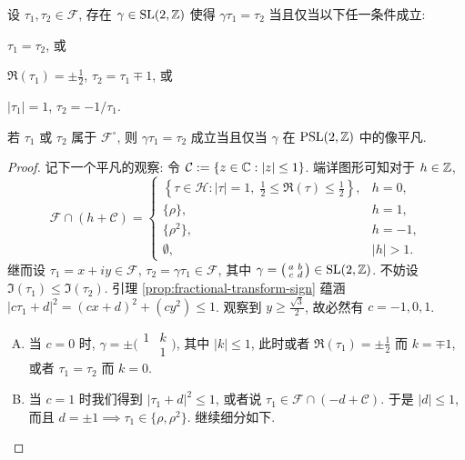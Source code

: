 \begin{lemma}\label{prop:full-fundamental-domain-aux}
	设 $\tau_1, \tau_2 \in \mathcal{F}$, 存在 $\gamma \in \operatorname{SL}(2,\mathbb{Z})$ 使得 $\gamma \tau_1 = \tau_2$ 当且仅当以下任一条件成立:
	\begin{compactitem}
		\item $\tau_1 = \tau_2$, 或
		\item $\Re(\tau_1) = \pm \frac{1}{2}$, $\tau_2 = \tau_1 \mp 1$, 或
		\item $|\tau_1|=1$, $\tau_2 = -1/\tau_1$.
	\end{compactitem}
	若 $\tau_1$ 或 $\tau_2$ 属于 $\mathcal{F}^\circ$, 则 $\gamma\tau_1 = \tau_2$ 成立当且仅当 $\gamma$ 在 $\operatorname{PSL}(2,\mathbb{Z})$ 中的像平凡.
\end{lemma}
\begin{proof}
	记下一个平凡的观察: 令 $\mathcal{C} := \{z \in \mathbb{C}: |z| \leq 1 \}$. 端详图形可知对于 $h \in \mathbb{Z}$,
	\[ \mathcal{F} \cap (h +  \mathcal{C} ) = \begin{cases}
		\left\{ \tau \in \mathcal{H}: |\tau| = 1, \; \frac{1}{2} \leq \Re(\tau) \leq \frac{1}{2} \right\}, & h=0, \\
		\{\rho\}, & h = 1, \\
		\{\rho^2 \}, & h = -1, \\
		\emptyset, & |h| > 1.
	\end{cases}\]
	继而设 $\tau_1 = x+iy \in \mathcal{F}$, $\tau_2 = \gamma\tau_1 \in \mathcal{F}$, 其中 $\gamma = \bigl(\begin{smallmatrix} a & b \\ c & d \end{smallmatrix}\bigr) \in \operatorname{SL}(2,\mathbb{Z})$. 不妨设 $\Im(\tau_1) \leq \Im(\tau_2)$. 引理 \ref{prop:fractional-transform-sign} 蕴涵 $|c\tau_1 + d|^2 = (cx+d)^2 + (cy^2) \leq 1$. 观察到 $y \geq \frac{\sqrt{3}}{2}$, 故必然有 $c = -1, 0, 1$.
	\begin{enumerate}[A.]
		\item 当 $c=0$ 时, $\gamma = \pm \bigl(\begin{smallmatrix} 1 & k \\ & 1 \end{smallmatrix}\bigr)$, 其中 $|k| \leq 1$, 此时或者 $\Re(\tau_1) = \pm \frac{1}{2}$ 而 $k=\mp 1$, 或者 $\tau_1=\tau_2$ 而 $k=0$.
		\item 当 $c=1$ 时我们得到 $|\tau_1 + d|^2 \leq 1$, 或者说 $\tau_1 \in \mathcal{F} \cap \left( -d + \mathcal{C} \right)$. 于是 $|d| \leq 1$, 而且 $d=\pm 1 \implies \tau_1 \in \{\rho, \rho^2\}$. 继续细分如下.
		\begin{compactitem}

\end{compactitem}
\end{enumerate}
\end{proof}

